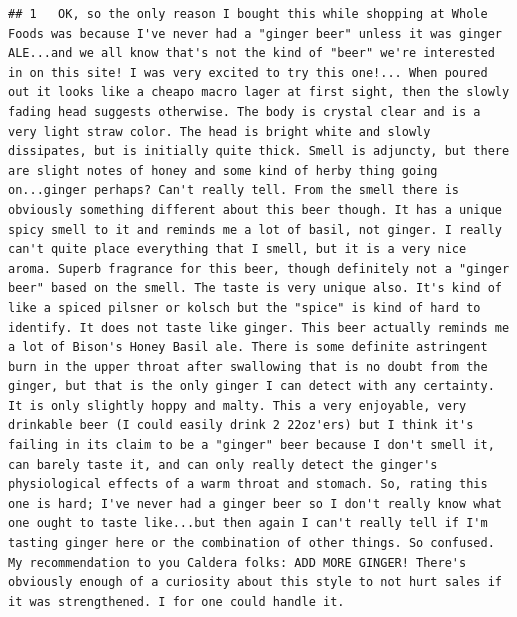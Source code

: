 \documentclass[
  a4paper,
]{article}
\begin{document}
\begin{verbatim}
## 1   OK, so the only reason I bought this while shopping at Whole Foods was because I've never had a "ginger beer" unless it was ginger ALE...and we all know that's not the kind of "beer" we're interested in on this site! I was very excited to try this one!... When poured out it looks like a cheapo macro lager at first sight, then the slowly fading head suggests otherwise. The body is crystal clear and is a very light straw color. The head is bright white and slowly dissipates, but is initially quite thick. Smell is adjuncty, but there are slight notes of honey and some kind of herby thing going on...ginger perhaps? Can't really tell. From the smell there is obviously something different about this beer though. It has a unique spicy smell to it and reminds me a lot of basil, not ginger. I really can't quite place everything that I smell, but it is a very nice aroma. Superb fragrance for this beer, though definitely not a "ginger beer" based on the smell. The taste is very unique also. It's kind of like a spiced pilsner or kolsch but the "spice" is kind of hard to identify. It does not taste like ginger. This beer actually reminds me a lot of Bison's Honey Basil ale. There is some definite astringent burn in the upper throat after swallowing that is no doubt from the ginger, but that is the only ginger I can detect with any certainty. It is only slightly hoppy and malty. This a very enjoyable, very drinkable beer (I could easily drink 2 22oz'ers) but I think it's failing in its claim to be a "ginger" beer because I don't smell it, can barely taste it, and can only really detect the ginger's physiological effects of a warm throat and stomach. So, rating this one is hard; I've never had a ginger beer so I don't really know what one ought to taste like...but then again I can't really tell if I'm tasting ginger here or the combination of other things. So confused. My recommendation to you Caldera folks: ADD MORE GINGER! There's obviously enough of a curiosity about this style to not hurt sales if it was strengthened. I for one could handle it.

\end{verbatim}
\end{document}
